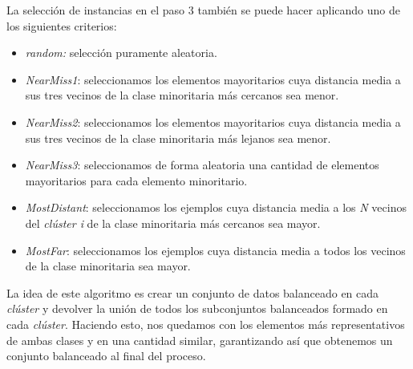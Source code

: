 La selección de instancias en el paso 3 también se puede hacer aplicando uno de los siguientes criterios:

\begin{itemize}
	\item \textit{random:} selección puramente aleatoria.
	\item \textit{NearMiss1}: seleccionamos los elementos mayoritarios cuya distancia media a sus tres vecinos de la clase minoritaria más cercanos sea menor.
	\item \textit{NearMiss2}: seleccionamos los elementos mayoritarios cuya distancia media a sus tres vecinos de la clase minoritaria más lejanos sea menor.
	\item \textit{NearMiss3}: seleccionamos de forma aleatoria una cantidad de elementos mayoritarios para cada elemento minoritario.
	\item \textit{MostDistant}: seleccionamos los ejemplos cuya distancia media a los \textit{N} vecinos del \textit{clúster i} de la clase minoritaria más cercanos sea mayor.
	\item \textit{MostFar}: seleccionamos los ejemplos cuya distancia media a todos los vecinos de la clase minoritaria sea mayor.
\end{itemize}

La idea de este algoritmo es crear un conjunto de datos balanceado en cada \textit{clúster} y devolver la unión de todos los subconjuntos balanceados formado en cada \textit{clúster}. Haciendo esto, nos quedamos con los elementos más representativos de ambas clases y en una cantidad similar, garantizando así que obtenemos un conjunto balanceado al final del proceso.
